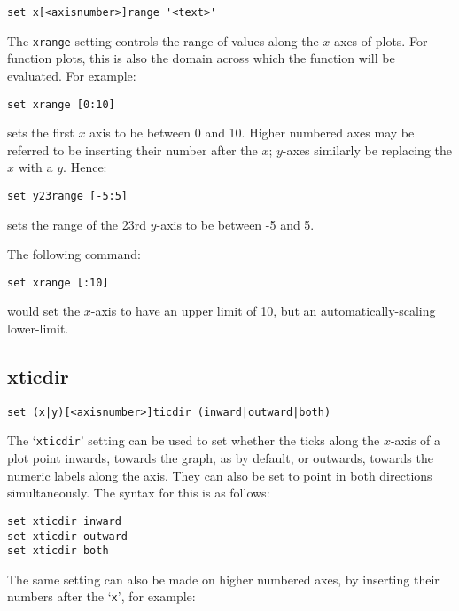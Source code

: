 \documentclass[a4paper,onecolumn,11pt]{book}
\begin{document}
\begin{verbatim}
set x[<axisnumber>]range '<text>'
\end{verbatim}

The {\tt xrange} setting controls the range of values along the $x$-axes of
plots.  For function plots, this is also the domain across which the function
will be evaluated.  For example:

\begin{verbatim}
set xrange [0:10]
\end{verbatim}

\noindent sets the first $x$ axis to be between 0 and 10.  Higher numbered axes may be
referred to be inserting their number after the $x$; $y$-axes similarly be
replacing the $x$ with a $y$.  Hence:

\begin{verbatim}
set y23range [-5:5]
\end{verbatim}

sets the range of the 23rd $y$-axis to be between -5 and 5.

The following command:

\begin{verbatim}
set xrange [:10]
\end{verbatim}

would set the $x$-axis to have an upper limit of 10, but an
automatically-scaling lower-limit.


\subsection{xticdir}

\begin{verbatim}
set (x|y)[<axisnumber>]ticdir (inward|outward|both)
\end{verbatim}

The `{\tt xticdir}' setting can be used to set whether the ticks along the
$x$-axis of a plot point inwards, towards the graph, as by default, or outwards,
towards the numeric labels along the axis. They can also be set to point in both
directions simultaneously. The syntax for this is as follows:

\begin{verbatim}
set xticdir inward 
set xticdir outward 
set xticdir both
\end{verbatim}

The same setting can also be made on higher numbered axes, by inserting their
numbers after the `{\tt x}', for example:
\end{document}
